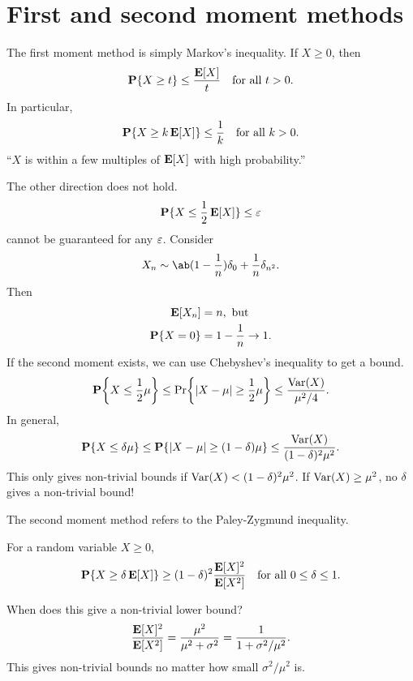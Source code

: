 \section{First and second moment methods} \label{sec:12moment}
The first moment method is simply Markov's inequality.
If $X \ge 0$, then \[
    \operatorname{\mathbf P}\{X \ge t\} \le \frac{\operatorname{\mathbf E}[X]}{t} \quad \text{for all } t > 0.
\] In particular, \[
    \operatorname{\mathbf P}\{X \ge k \operatorname{\mathbf E}[X]\} \le \frac1k \quad \text{for all } k > 0.
\] ``$X$ is within a few multiples of $\operatorname{\mathbf E}[X]$ with high probability.''

The other direction does not hold. \[
    \operatorname{\mathbf P}\{X \le \frac12 \operatorname{\mathbf E}[X]\} \le \varepsilon
\] cannot be guaranteed for any $\varepsilon$.
Consider \begin{equation}
    X_n \sim \ab(1 - \frac1n) \delta_0 + \frac1n \delta_{n^2}.
        \label{eq:12Xn}
\end{equation} Then \begin{align*}
    \operatorname{\mathbf E}[X_n] &= n, \text{ but} \\
    \operatorname{\mathbf P}\{X = 0\} &= 1 - \frac1n \to 1.
\end{align*}
If the second moment exists, we can use Chebyshev's inequality to get a
bound. \[
    \P\set*{X \le \frac12 \mu}
        \le \Pr\set*{\abs{X - \mu} \ge \frac12 \mu}
        \le \frac{\Var(X)}{\mu^2 / 4}.
\] In general, \[
    \operatorname{\mathbf P}\{X \le \delta \mu\}
        \le \operatorname{\mathbf P}\{\lvert X - \mu\rvert \ge (1 - \delta) \mu\}
        \le \frac{\operatorname{Var}(X)}{(1 - \delta)^2 \mu^2}.
\] This only gives non-trivial bounds if $\operatorname{Var}(X) < (1 - \delta)^2 \mu^2$.
If $\operatorname{Var}(X) \ge \mu^2$, no $\delta$ gives a non-trivial bound!

The second moment method refers to the Paley-Zygmund inequality.
\begin{proposition} \label{thm:pz}
    For a random variable $X \ge 0$, \[
        \operatorname{\mathbf P}\{X \ge \delta \operatorname{\mathbf E}[X]\} \ge (1 - \delta)^2 \frac{\operatorname{\mathbf E}[X]^2}{\operatorname{\mathbf E}[X^2]}
        \quad \text{for all } 0 \le \delta \le 1.
    \]
\end{proposition}
When does this give a non-trivial lower bound?
\[
    \frac{\operatorname{\mathbf E}[X]^2}{\operatorname{\mathbf E}[X^2]}
        = \frac{\mu^2}{\mu^2 + \sigma^2}
        = \frac{1}{1 + \sigma^2 / \mu^2}.
\] This gives non-trivial bounds no matter how small $\sigma^2 / \mu^2$ is.

